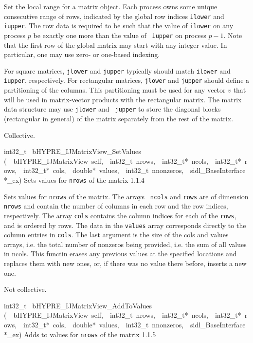 \documentclass{article}
\begin{document}
\begin{cxxentry}
\begin{cxxentry}
\begin{cxxfunction}
\begin{cxxdoc}
Set the local range for a matrix object.  Each process owns
some unique consecutive range of rows, indicated by the
global row indices {\tt ilower} and {\tt iupper}.  The row
data is required to be such that the value of {\tt ilower} on
any process $p$ be exactly one more than the value of {\tt
iupper} on process $p-1$.  Note that the first row of the
global matrix may start with any integer value.  In
particular, one may use zero- or one-based indexing.

For square matrices, {\tt jlower} and {\tt jupper} typically
should match {\tt ilower} and {\tt iupper}, respectively.
For rectangular matrices, {\tt jlower} and {\tt jupper}
should define a partitioning of the columns.  This
partitioning must be used for any vector $v$ that will be
used in matrix-vector products with the rectangular matrix.
The matrix data structure may use {\tt jlower} and {\tt
jupper} to store the diagonal blocks (rectangular in general)
of the matrix separately from the rest of the matrix.

Collective.
\end{cxxdoc}
\end{cxxfunction}
\begin{cxxfunction}
{int32\_t\ }
        {bHYPRE\_IJMatrixView\_SetValues}
        {(\ \ bHYPRE\_IJMatrixView\ self,\ \ int32\_t\ nrows,\ \ int32\_t*\ ncols,\ \ int32\_t*\ rows,\ \ int32\_t*\ cols,\ \ double*\ values,\ \ int32\_t\ nnonzeros,\ \ sidl\_BaseInterface\ *\_ex)}
        {
Sets values for {\tt nrows} of the matrix}
        {1.1.4}
\begin{cxxdoc}

Sets values for {\tt nrows} of the matrix.  The arrays {\tt
ncols} and {\tt rows} are of dimension {\tt nrows} and
contain the number of columns in each row and the row
indices, respectively.  The array {\tt cols} contains the
column indices for each of the {\tt rows}, and is ordered by
rows.  The data in the {\tt values} array corresponds
directly to the column entries in {\tt cols}.  The last argument
is the size of the cols and values arrays, i.e. the total number
of nonzeros being provided, i.e. the sum of all values in ncols.
This functin erases any previous values at the specified locations and
replaces them with new ones, or, if there was no value there before,
inserts a new one.

Not collective.
\end{cxxdoc}
\end{cxxfunction}
\begin{cxxfunction}
{int32\_t\ }
        {bHYPRE\_IJMatrixView\_AddToValues}
        {(\ \ bHYPRE\_IJMatrixView\ self,\ \ int32\_t\ nrows,\ \ int32\_t*\ ncols,\ \ int32\_t*\ rows,\ \ int32\_t*\ cols,\ \ double*\ values,\ \ int32\_t\ nnonzeros,\ \ sidl\_BaseInterface\ *\_ex)}
        {
Adds to values for {\tt nrows} of the matrix}
        {1.1.5}
\begin{cxxdoc}


\end{cxxdoc}
\end{cxxfunction}
\end{cxxentry}
\end{cxxentry}
\end{document}
